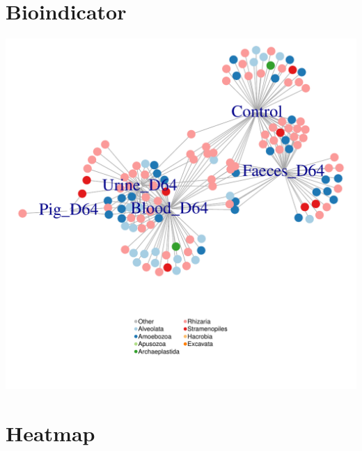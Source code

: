 \documentclass[11pt,english]{article}\usepackage[]{graphicx}\usepackage{xcolor}
\makeatletter
\def\maxwidth{ %
  \ifdim\Gin@nat@width>\linewidth
    \linewidth
  \else
    \Gin@nat@width
  \fi
}
\newenvironment{knitrout}{}{} %
\makeatother
\begin{document}
% 






\section{Bioindicator}

\begin{knitrout}
\color{fgcolor}
\includegraphics[width=\maxwidth]{figure/image-bioindic-1} 

\end{knitrout}

\section{Heatmap}
\end{document}

